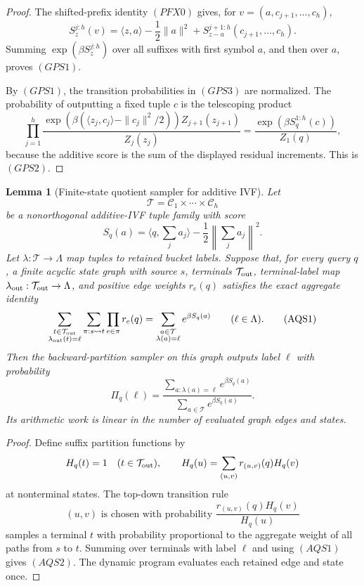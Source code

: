 \documentclass[10pt]{article}
\newtheorem{lemma}[theorem]{Lemma}
\theoremstyle{definition}
\newcommand{\ip}[2]{\langle #1,#2\rangle}
\begin{document}
\begin{proof}
   The shifted-prefix identity \((PFX0)\) gives, for
   \(v=(a,c_{j+1},\ldots,c_h)\),
   \[
      S_z^{j:h}(v)
      =
      \ip{z}{a}-\frac12\|a\|^2
      +
      S_{z-a}^{j+1:h}(c_{j+1},\ldots,c_h).
   \]
   Summing \(\exp(\beta S_z^{j:h})\) over all suffixes with first symbol
   \(a\), and then over \(a\), proves \((GPS1)\).

   By \((GPS1)\), the transition probabilities in \((GPS3)\) are normalized.
   The probability of outputting a fixed tuple \(c\) is the telescoping product
   \[
      \prod_{j=1}^h
      \frac{
         \exp\!\left(\beta(\ip{z_j}{c_j}-\|c_j\|^2/2)\right)
         Z_{j+1}(z_{j+1})
      }{
         Z_j(z_j)
      }
      =
      \frac{
         \exp(\beta S_q^{1:h}(c))
      }{
         Z_1(q)
      },
   \]
   because the additive score is the sum of the displayed residual increments.
   This is \((GPS2)\).
\end{proof}

\begin{lemma}[Finite-state quotient sampler for additive IVF]
   \label{lem:gibbs-aq-state-quotient}
   Let
   \[
      \mathcal T=\mathcal C_1\times\cdots\times\mathcal C_h
   \]
   be a nonorthogonal additive-IVF tuple family with score
   \[
      S_q(a)=\ip{q}{\sum_ja_j}
      -\frac12\left\|\sum_ja_j\right\|^2 .
   \]
   Let \(\lambda:\mathcal T\to\Lambda\) map tuples to retained bucket labels.
   Suppose that, for every query \(q\), a finite acyclic state graph with
   source \(s\), terminals \(\mathcal T_{\rm out}\), terminal-label map
   \(\lambda_{\rm out}:\mathcal T_{\rm out}\to\Lambda\), and positive edge
   weights \(r_e(q)\) satisfies the exact aggregate identity
   \[
      \sum_{\substack{t\in\mathcal T_{\rm out}\\ \lambda_{\rm out}(t)=\ell}}
      \sum_{\pi:s\leadsto t}\prod_{e\in\pi}r_e(q)
      =
      \sum_{\substack{a\in\mathcal T\\ \lambda(a)=\ell}}
      e^{\beta S_q(a)}
      \qquad(\ell\in\Lambda).
      \tag{AQS1}
   \]
   Then the backward-partition sampler on this graph outputs label
   \(\ell\) with probability
   \[
      \Pi_q(\ell)=
      \frac{\sum_{a:\lambda(a)=\ell}e^{\beta S_q(a)}}
           {\sum_{a\in\mathcal T}e^{\beta S_q(a)}}.
      \tag{AQS2}
   \]
   Its arithmetic work is linear in the number of evaluated graph edges and
   states.
\end{lemma}

\begin{proof}
   Define suffix partition functions by
   \[
      H_q(t)=1\quad(t\in\mathcal T_{\rm out}),
      \qquad
      H_q(u)=\sum_{(u,v)}r_{(u,v)}(q)H_q(v)
   \]
   at nonterminal states.  The top-down transition rule
   \[
      (u,v)\text{ is chosen with probability }
      \frac{r_{(u,v)}(q)H_q(v)}{H_q(u)}
   \]
   samples a terminal \(t\) with probability proportional to the aggregate
   weight of all paths from \(s\) to \(t\).  Summing over terminals with label
   \(\ell\) and using \((AQS1)\) gives \((AQS2)\).  The dynamic program
   evaluates each retained edge and state once.
\end{proof}
\end{document}
